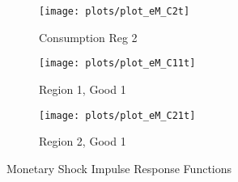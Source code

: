 \documentclass[../thesis.tex]{subfiles}
\begin{document}
\begin{figure}[h!]
		\begin{subfigure}[b]{0.25\textwidth}
			\centering
			\texttt{[image: plots/plot\_eM\_C2t]}
			\caption{\footnotesize Consumption Reg 2}
			\label{fig:ZMt-C2t}
		\end{subfigure}
		\hfill
		\begin{subfigure}[b]{0.25\textwidth}
			\centering
			\texttt{[image: plots/plot\_eM\_C11t]}
			\caption{\footnotesize Region 1, Good 1}
			\label{fig:ZMt-C11t}
		\end{subfigure}
		\hfill
		\begin{subfigure}[b]{0.25\textwidth}
			\centering
			\texttt{[image: plots/plot\_eM\_C21t]}
			\caption{\footnotesize Region 2, Good 1}
			\label{fig:ZMt-C21t}
		\end{subfigure}
		\hfill
		\vspace*{0.5cm}		
		\caption{Monetary Shock Impulse Response Functions}
		\label{fig:ZMt-irf}
	\end{figure}


\newpage
\end{document}
